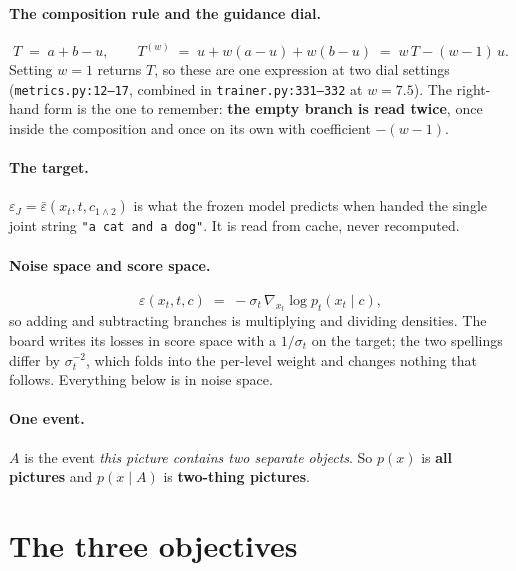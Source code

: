 \documentclass[11pt]{article}
\newcommand{\eps}{\varepsilon}
\newcommand{\epsfr}{\bar\eps}
\newcommand{\xt}{x_t}
\begin{document}
\paragraph{The composition rule and the guidance dial.}
\begin{equation}
  T \;=\; a + b - u,
  \qquad
  T^{(w)} \;=\; u + w(a-u) + w(b-u) \;=\; w\,T - (w-1)\,u .
  \label{eq:compose}
\end{equation}
Setting $w=1$ returns $T$, so these are one expression at two dial settings
(\texttt{metrics.py:12--17}, combined in \texttt{trainer.py:331--332} at $w = 7.5$). The right-hand form is the one to remember: \textbf{the empty branch is read twice},
once inside the composition and once on its own with coefficient $-(w-1)$.

\paragraph{The target.}
$\eps_J = \epsfr(\xt,t,c_{1\wedge2})$ is what the frozen model predicts when handed the single
joint string \texttt{"a cat and a dog"}. It is read from cache, never recomputed.

\paragraph{Noise space and score space.}
\begin{equation}
  \eps(\xt,t,c) \;=\; -\sigma_t \, \nabla_{\xt} \log p_t(\xt \mid c),
  \label{eq:bridge}
\end{equation}
so adding and subtracting branches is multiplying and dividing densities. The board writes its
losses in score space with a $1/\sigma_t$ on the target; the two spellings differ by $\sigma_t^{-2}$,
which folds into the per-level weight and changes nothing that follows. Everything below is in
noise space.

\paragraph{One event.}
$A$ is the event \emph{this picture contains two separate objects}. So $p(x)$ is
\textbf{all pictures} and $p(x \mid A)$ is \textbf{two-thing pictures}.

\section{The three objectives}
\end{document}
